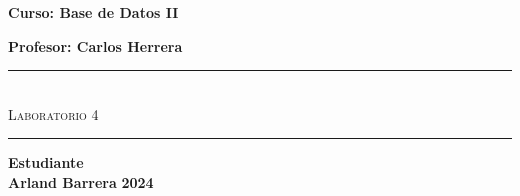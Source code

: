 \begin{titlepage}
\begin{center}
      {\Large \textbf{Curso: Base de Datos II}}\medskip
      
      {\Large \textbf{Profesor: Carlos Herrera}}

      \rule{\linewidth}{0.75mm}\\
          {\Large \textsc{Laboratorio 4}} 
      \rule{\linewidth}{0.75mm}\medskip

      {\Large \textbf{Estudiante}}\\
      \vspace{5mm}
      {\Large \textbf{Arland Barrera}}
      \vfill
      {\Huge \textbf{2024}}

  \end{center}
\end{titlepage}